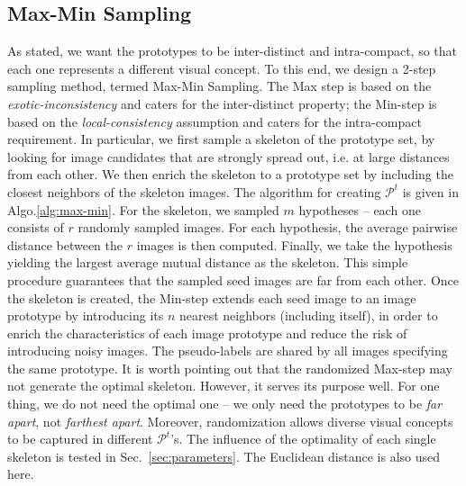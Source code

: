 \subsection{Max-Min Sampling} 
\label{sec:max-min}
As stated, we want the prototypes to be inter-distinct and
intra-compact, so that each one represents a different visual
concept. To this end, we design a 2-step sampling method, termed
Max-Min Sampling. The Max step is based on the
\emph{exotic-inconsistency} and caters for the inter-distinct
property; the Min-step is based on the \emph{local-consistency}
assumption and caters for the intra-compact requirement. In particular, we first
sample a skeleton of the prototype set, by looking for image
candidates that are strongly spread out, i.e. at large distances from
each other. We then enrich the skeleton to a prototype set by
including the closest neighbors of the skeleton images.
The algorithm for creating $\mathcal{P}^t$ is given in
Algo.\ref{alg:max-min}. For the skeleton, we sampled $m$
hypotheses -- each one consists of $r$ randomly sampled images. 
For each hypothesis, the average pairwise distance between the $r$ images is then computed. 
Finally, we take the hypothesis yielding the largest average mutual distance as the skeleton. 
This simple
procedure guarantees that the sampled seed images are far from each
other. Once the skeleton is created, the Min-step extends each seed
image to an image prototype by introducing its $n$ nearest neighbors
(including itself), in order to enrich the characteristics of each
image prototype and reduce the risk of introducing noisy images. The
pseudo-labels are shared by all images specifying the same prototype.
It is worth pointing out that the randomized Max-step may not generate
the optimal skeleton. However, it serves its purpose well. For one
thing, we do not need the optimal one -- we only need the prototypes
to be \emph{far apart}, not \emph{farthest apart}.  Moreover, randomization allows diverse visual
concepts to be captured in different $\mathcal{P}^t$'s. 
The influence of the optimality of each single skeleton is tested in Sec.~\ref{sec:parameters}.
The Euclidean distance is also used here. 


